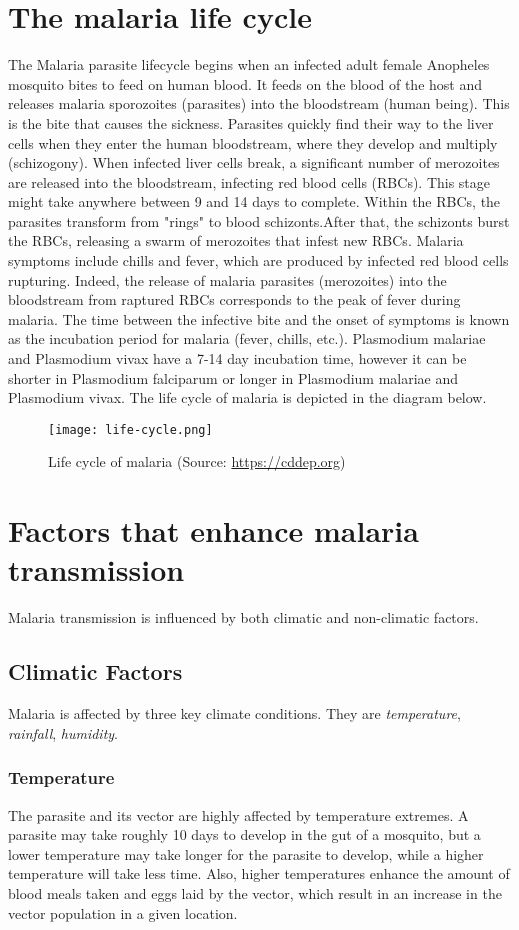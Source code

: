 \section{The malaria life cycle}
The Malaria parasite lifecycle begins when an infected adult female Anopheles mosquito bites to feed on human blood. It feeds on the blood of the host and releases malaria sporozoites (parasites) into the bloodstream (human being). This is the bite that causes the sickness. Parasites quickly find their way to the liver cells when they enter the human bloodstream, where they develop and multiply (schizogony). When infected liver cells break, a significant number of merozoites are released into the bloodstream, infecting red blood cells (RBCs). This stage might take anywhere between 9 and 14 days to complete. Within the RBCs, the parasites transform from "rings" to blood schizonts.After that, the schizonts burst the RBCs, releasing a swarm of merozoites that infest new RBCs. Malaria symptoms include chills and fever, which are produced by infected red blood cells rupturing. Indeed, the release of malaria parasites (merozoites) into the bloodstream from raptured RBCs corresponds to the peak of fever during malaria. The time between the infective bite and the onset of symptoms is known as the incubation period for malaria (fever, chills, etc.). Plasmodium malariae and Plasmodium vivax have a 7-14 day incubation time, however it can be shorter in Plasmodium falciparum or longer in Plasmodium malariae and Plasmodium vivax. The life cycle of malaria is depicted in the diagram below.

\begin{figure}[h]
	\centering
	\texttt{[image: life-cycle.png]}
	\caption{Life cycle of malaria (Source: \url{https://cddep.org})}
	
\end{figure}


\section{Factors that enhance malaria transmission}
Malaria transmission is influenced by both climatic and non-climatic factors.
	\subsection{Climatic Factors}
Malaria is affected by three key climate conditions. They are \emph{temperature}, \emph{rainfall}, \emph{humidity}.

		\subsubsection{Temperature}
		The parasite and its vector are highly affected by temperature extremes. A parasite may take roughly 10 days to develop in the gut of a mosquito, but a lower temperature may take longer for the parasite to develop, while a higher temperature will take less time. Also, higher temperatures enhance the amount of blood meals taken and eggs laid by the vector, which result in an increase in the vector population in a given location. 	
